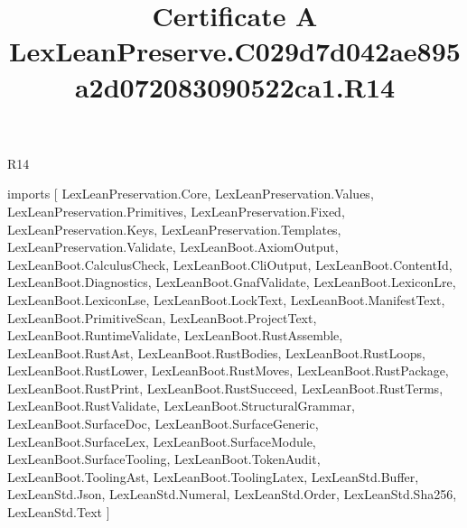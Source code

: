 \begin{lexlean}{R14}
\title{Certificate A LexLeanPreserve.C029d7d042ae895a2d072083090522ca1.R14}
\begin{coremodule}
imports [
  LexLeanPreservation.Core,
  LexLeanPreservation.Values,
  LexLeanPreservation.Primitives,
  LexLeanPreservation.Fixed,
  LexLeanPreservation.Keys,
  LexLeanPreservation.Templates,
  LexLeanPreservation.Validate,
  LexLeanBoot.AxiomOutput,
  LexLeanBoot.CalculusCheck,
  LexLeanBoot.CliOutput,
  LexLeanBoot.ContentId,
  LexLeanBoot.Diagnostics,
  LexLeanBoot.GnafValidate,
  LexLeanBoot.LexiconLre,
  LexLeanBoot.LexiconLse,
  LexLeanBoot.LockText,
  LexLeanBoot.ManifestText,
  LexLeanBoot.PrimitiveScan,
  LexLeanBoot.ProjectText,
  LexLeanBoot.RuntimeValidate,
  LexLeanBoot.RustAssemble,
  LexLeanBoot.RustAst,
  LexLeanBoot.RustBodies,
  LexLeanBoot.RustLoops,
  LexLeanBoot.RustLower,
  LexLeanBoot.RustMoves,
  LexLeanBoot.RustPackage,
  LexLeanBoot.RustPrint,
  LexLeanBoot.RustSucceed,
  LexLeanBoot.RustTerms,
  LexLeanBoot.RustValidate,
  LexLeanBoot.StructuralGrammar,
  LexLeanBoot.SurfaceDoc,
  LexLeanBoot.SurfaceGeneric,
  LexLeanBoot.SurfaceLex,
  LexLeanBoot.SurfaceModule,
  LexLeanBoot.SurfaceTooling,
  LexLeanBoot.TokenAudit,
  LexLeanBoot.ToolingAst,
  LexLeanBoot.ToolingLatex,
  LexLeanStd.Buffer,
  LexLeanStd.Json,
  LexLeanStd.Numeral,
  LexLeanStd.Order,
  LexLeanStd.Sha256,
  LexLeanStd.Text
]


\end{coremodule}
\end{lexlean}
